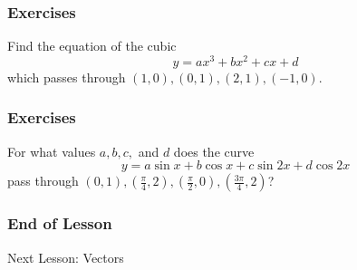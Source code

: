 \documentclass[xcolor=dvipsnames]{beamer}
\begin{document}
\begin{frame}
  \frametitle{Exercises}
  {\ubung} Find the equation of the cubic
  \begin{equation}
    \label{eq:xifeelie}
    y=ax^{3}+bx^{2}+cx+d
  \end{equation}
which passes through $(1,0),(0,1),(2,1),(-1,0)$.
\end{frame}

\begin{frame}
  \frametitle{Exercises}
  {\ubung} For what values $a,b,c,$ and $d$ does the curve
  \begin{equation}
    \label{eq:zeiniyah}
    y=a\sin{}x+b\cos{}x+c\sin{}2x+d\cos{}2x
  \end{equation}
pass through $(0,1),(\frac{\pi}{4},2),(\frac{\pi}{2},0),(\frac{3\pi}{4},2)$?
\end{frame}

\begin{frame}
  \frametitle{End of Lesson}
Next Lesson: Vectors
\end{frame}
\end{document}
